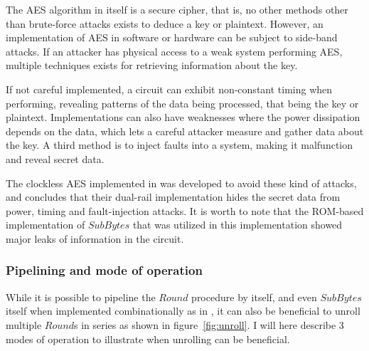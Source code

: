The AES algorithm in itself is a secure cipher, that is, no other
methods other than brute-force attacks exists to deduce a key or
plaintext. However, an implementation of AES in software or hardware
can be subject to side-band attacks. If an attacker has physical
access to a weak system performing AES, multiple techniques exists for
retrieving information about the key.

If not careful implemented, a circuit can exhibit non-constant timing
when performing, revealing patterns of the data being processed, that
being the key or plaintext. Implementations can also have weaknesses
where the power dissipation depends on the data, which lets a careful
attacker measure and gather data about the key. A third method is to
inject faults into a system, making it malfunction and reveal secret
data.

The clockless AES implemented in \cite{claes} was developed to avoid
these kind of attacks, and concludes that their dual-rail
implementation hides the secret data from power, timing and
fault-injection attacks. It is worth to note that the ROM-based
implementation of $SubBytes$ that was utilized in this implementation
showed major leaks of information in the circuit.


\subsubsection{Pipelining and mode of operation}

While it is possible to pipeline the $Round$ procedure by itself, and
even $SubBytes$ itself when implemented combinationally as in
\cite{csbox}, it can also be beneficial to unroll multiple $Round$s in
series as shown in figure~\ref{fig:unroll}. I will here describe 3
modes of operation to illustrate when unrolling can be beneficial.

